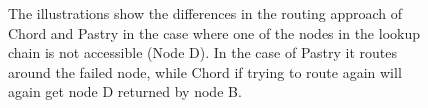 \begin{figure}[!htb]
  \centering
  \caption{The illustrations show the differences in the routing approach of Chord and Pastry in the case where one of the nodes in the lookup chain is not accessible (Node D). In the case of Pastry it routes around the failed node, while Chord if trying to route again will again get node D returned by node B.}
\end{figure}

